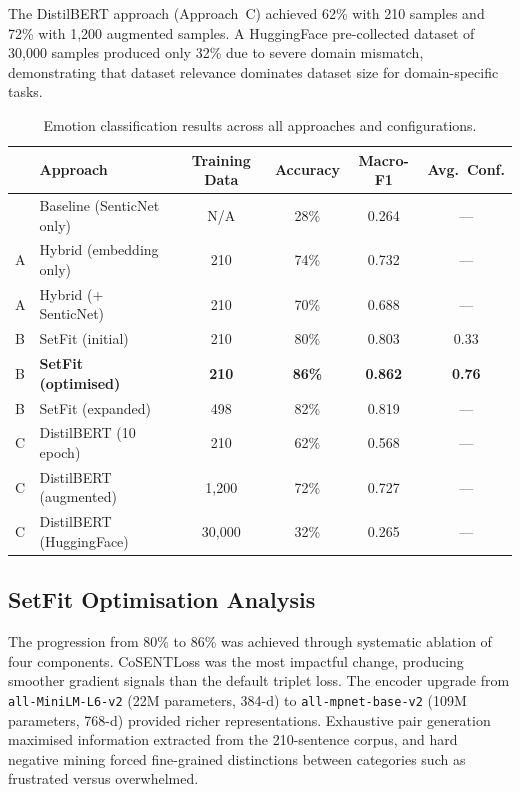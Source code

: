 The DistilBERT approach (Approach~C) achieved 62\% with 210 samples and 72\% with 1,200 augmented samples. A HuggingFace pre-collected dataset of 30,000 samples produced only 32\% due to severe domain mismatch, demonstrating that dataset relevance dominates dataset size for domain-specific tasks.

\begin{table}[htbp]
  \centering
  \caption{Emotion classification results across all approaches and configurations.}
  \label{tab:classification-results}
  \begin{tabular}{@{}llcccc@{}}
    \toprule
    & \textbf{Approach} & \textbf{Training Data} & \textbf{Accuracy} & \textbf{Macro-F1} & \textbf{Avg.\ Conf.} \\
    \midrule
    & Baseline (SenticNet only) & N/A & 28\% & 0.264 & --- \\
    A & Hybrid (embedding only) & 210 & 74\% & 0.732 & --- \\
    A & Hybrid (+ SenticNet) & 210 & 70\% & 0.688 & --- \\
    B & SetFit (initial) & 210 & 80\% & 0.803 & 0.33 \\
    B & \textbf{SetFit (optimised)} & \textbf{210} & \textbf{86\%} & \textbf{0.862} & \textbf{0.76} \\
    B & SetFit (expanded) & 498 & 82\% & 0.819 & --- \\
    C & DistilBERT (10 epoch) & 210 & 62\% & 0.568 & --- \\
    C & DistilBERT (augmented) & 1,200 & 72\% & 0.727 & --- \\
    C & DistilBERT (HuggingFace) & 30,000 & 32\% & 0.265 & --- \\
    \bottomrule
  \end{tabular}
\end{table}

\subsection{SetFit Optimisation Analysis}
\label{subsec:setfit-optimisation}

The progression from 80\% to 86\% was achieved through systematic ablation of four components. CoSENTLoss was the most impactful change, producing smoother gradient signals than the default triplet loss. The encoder upgrade from \texttt{all-MiniLM-L6-v2} (22M parameters, 384-d) to \texttt{all-mpnet-base-v2} (109M parameters, 768-d) provided richer representations. Exhaustive pair generation maximised information extracted from the 210-sentence corpus, and hard negative mining forced fine-grained distinctions between categories such as frustrated versus overwhelmed.

